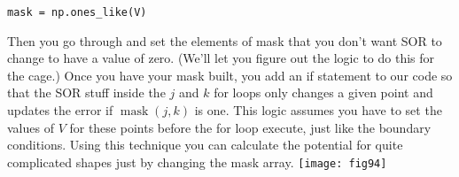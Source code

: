 \begin{enumerate}[label=(\alph*)]
\begin{lstlisting}
mask = np.ones_like(V)
\end{lstlisting}
Then you go through and set the elements of mask that you don't want SOR to change to have a value of zero. (We'll let you figure out the logic to do this for the cage.) Once you have your mask built, you add an if statement to our code so that the SOR stuff inside the $j$ and $k$ for loops only changes a given point and updates the error if $\operatorname{mask}(j, k)$ is one. This logic assumes you have to set the values of $V$ for these points before the for loop execute, just like the boundary conditions. Using this technique you can calculate the potential for quite complicated shapes just by changing the mask array.
\texttt{[image: fig94]}
\end{enumerate}
